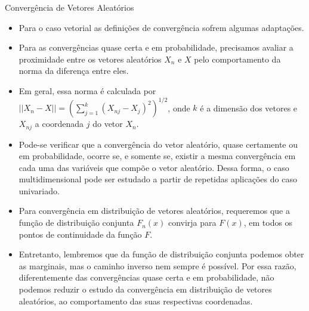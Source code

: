 %
\begin{frame}{Convergência de Vetores Aleatórios}
\begin{block}{}
	\begin{itemize}
%
\item Para o caso vetorial as definições de convergência sofrem algumas
adaptações. 

\item Para as convergências quase certa e em probabilidade,
precisamos avaliar a proximidade entre os vetores aleatórios $X_n$ e
$X$ pelo comportamento da norma da diferença entre eles. 

\item Em geral,
essa norma é calculada por
$||X_n-X||=(\sum_{j=1}^{k}(X_{nj}-X_j)^2)^{1/2}$, onde $k$ é a
dimensão dos vetores e $X_{nj}$ a coordenada $j$ do vetor $X_n$. 

\item Pode-se verificar que a convergência do vetor aleatório, quase
certamente ou em probabilidade, ocorre se, e somente se, existir a
mesma convergência em cada uma das variáveis que compõe o vetor
aleatório. Dessa forma, o caso multidimensional pode ser estudado a
partir de repetidas aplicações do caso univariado.

\item Para convergência em distribuição de vetores aleatórios, requeremos
que a função de distribuição conjunta $F_n(x)$ convirja para $F(x)$,
em todos os pontos de continuidade da função $F$. 

\item Entretanto,
lembremos que da função de distribuição conjunta podemos obter as
marginais, mas o caminho inverso nem sempre é possível. Por essa
razão, diferentemente das convergências quase certa e em
probabilidade, não podemos reduzir o estudo da convergência em
distribuição de vetores aleatórios, ao comportamento das suas
respectivas coordenadas. 

\end{itemize}
\end{block}
\end{frame}

